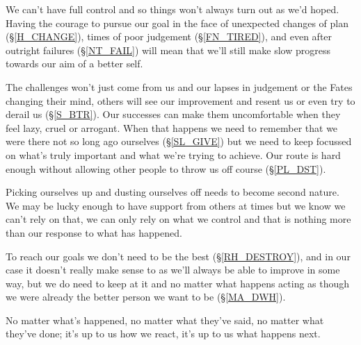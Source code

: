\cleardoublepage
{\small

We can't have full control and so things won't always turn out as we'd hoped. Having the courage to pursue our goal in the face of unexpected changes of plan (\S \ref{H_CHANGE}), times of poor judgement (\S \ref{FN_TIRED}), and even after outright failures (\S \ref{NT_FAIL}) will mean that we'll still make slow progress towards our aim of a better self. 

The challenges won't just come from us and our lapses in judgement or the Fates changing their mind, others will see our improvement and resent us or even try to derail us (\S \ref{S_BTR}). Our successes can make them uncomfortable when they feel lazy, cruel or arrogant. When that happens we need to remember that we were there not so long ago ourselves (\S \ref{SL_GIVE}) but we need to keep focussed on what's truly important and what we're trying to achieve. Our route is hard enough without allowing other people to throw us off course (\S \ref{PL_DST}).

Picking ourselves up and dusting ourselves off needs to become second nature. We may be lucky enough to have support from others at times but we know we can't rely on that, we can only rely on what we control and that is nothing more than our response to what has happened.

To reach our goals we don't need to be the best (\S \ref{RH_DESTROY}), and in our case it doesn't really make sense to  as we'll always be able to improve in some way, but we do need to keep at it and no matter what happens acting as though we were already the better person we want to be (\S \ref{MA_DWH}).

No matter what's happened, no matter what they've said, no matter what they've done; it's up to us how we react, it's up to us what happens next.

}
